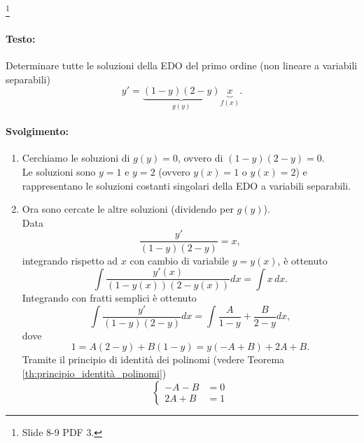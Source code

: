 \begin{example}\footnote{Slide 8-9 PDF 3.}
    \paragraph{Testo:} Determinare tutte le soluzioni della EDO del primo ordine (non lineare a variabili separabili)
    \begin{equation}\label{eq:esercizio_1_edo_variabili_separabili}
        y' = \underbrace{(1-y)(2-y)}_{g(y)}\underbrace{x}_{f(x)}.
    \end{equation}
    \paragraph{Svolgimento:}
    \begin{enumerate}
        \item Cerchiamo le soluzioni di $g(y)=0$, ovvero di $(1-y)(2-y) = 0$.\\
        Le soluzioni sono $y=1$ e $y=2$ (ovvero $y(x)=1$ o $y(x)=2$) e rappresentano le soluzioni costanti singolari della EDO a variabili separabili.
        \item Ora sono cercate le altre soluzioni (dividendo per $g(y)$).\\
        Data
        \begin{equation*}
            \frac{y'}{(1-y)(2-y)}=x,
        \end{equation*}
        integrando rispetto ad $x$ con cambio di variabile $y=y(x)$, è ottenuto
        \begin{equation*}
            \int \frac{y'(x)}{(1-y(x))(2-y(x))} dx = \int x\, dx.
        \end{equation*}
        Integrando con fratti semplici è ottenuto
        \begin{equation*}
            \int\frac{y'}{(1-y)(2-y)}dx = \int \frac{A}{1-y}+\frac{B}{2-y}dx,
        \end{equation*}
        dove
        \begin{equation*}
            1 = A(2-y)+B(1-y)=y(-A+B)+2A+B.
        \end{equation*}
        Tramite il principio di identità dei polinomi (vedere Teorema \ref{th:principio_identità_polinomi})
        \begin{equation*}
            \begin{cases}
                -A-B&=0\\
                2A+B&=1

\end{cases}
\end{equation*}
\end{enumerate}
\end{example}
